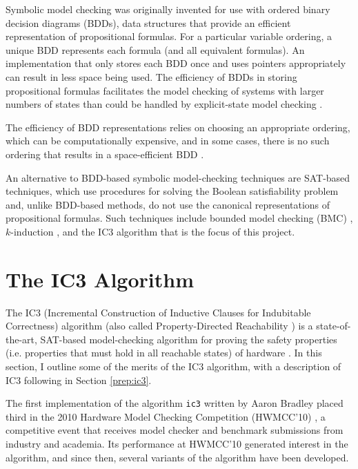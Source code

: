 \documentclass[12pt,a4paper,twoside,openright]{report}
\begin{document}
Symbolic model checking was originally invented for use with ordered
binary decision diagrams (BDDs), data structures that provide an efficient
representation of propositional formulas. For a particular variable
ordering, a unique BDD represents each formula (and all equivalent formulas).
An implementation that only stores each BDD once and uses pointers appropriately
can result in less space being used.
The efficiency of BDDs in storing propositional formulas facilitates the model
checking of systems with larger numbers of states than could be handled
by explicit-state model checking \cite{mcmillan92}.

The efficiency of BDD representations relies on choosing an appropriate
ordering, which can be computationally expensive, and in some cases,
there is no such ordering that results in a space-efficient BDD
\cite{biere99a}.

An alternative to BDD-based symbolic model-checking techniques are SAT-based
techniques, which use procedures for solving the Boolean satisfiability
problem and, unlike BDD-based methods, do not use the canonical representations
of propositional formulas.
Such techniques include bounded model checking (BMC)
\cite{biere99a}, $k$-induction \cite{sheeran00},
and the IC3 algorithm that is the focus of this project.


\section{The IC3 Algorithm}


The IC3 (Incremental Construction of Inductive Clauses for Indubitable Correctness)
algorithm (also called Property-Directed Reachability \cite{een11}) is a state-of-the-art,
SAT-based model-checking
algorithm for proving the safety properties (i.e. properties that must hold
in all reachable states) of hardware \cite{bradley11}. In this section, I outline some of the
merits of the IC3 algorithm, with a description of IC3 following in Section
\ref{prep:ic3}.

The first implementation of the algorithm \verb,ic3, written by Aaron Bradley placed third in
the 2010 Hardware Model Checking Competition (HWMCC'10) \cite{hwmcc10},
a competitive event that receives model checker and benchmark submissions from
industry and
academia. Its performance at HWMCC'10 generated interest in the algorithm, and
since then, several variants of the algorithm have been developed.
\end{document}
